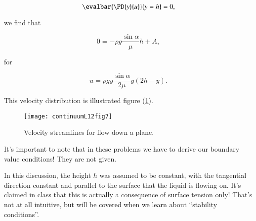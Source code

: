 \begin{equation}\label{eqn:continuumL12:510b}
\evalbar{\PD{y}{u}}{y = h} = 0,
\end{equation}

we find that

\begin{equation}\label{eqn:continuumL12:510c}
0 = - \rho g \frac{\sin\alpha}{\mu} h + A,
\end{equation}

for

\begin{equation}\label{eqn:classicalMechanicsPs2:530}
u = \rho g y \frac{\sin\alpha}{2 \mu} y \left( 2 h - y \right).
\end{equation}

This velocity distribution is illustrated figure (\ref{fig:continuumL12:continuumL12fig7}).

\begin{figure}[htp]
   \centering
   \texttt{[image: continuumL12fig7]}
   \caption{Velocity streamlines for flow down a plane.}\label{fig:continuumL12:continuumL12fig7}
\end{figure}

It's important to note that in these problems we have to derive our boundary value conditions!  They are not given.

In this discussion, the height $h$ was assumed to be constant, with the tangential direction constant and parallel to the surface that the liquid is flowing on.  It's claimed in class that this is actually a consequence of surface tension only!  That's not at all intuitive, but will be covered when we learn about ``stability conditions''.

%
%
\EndArticle
